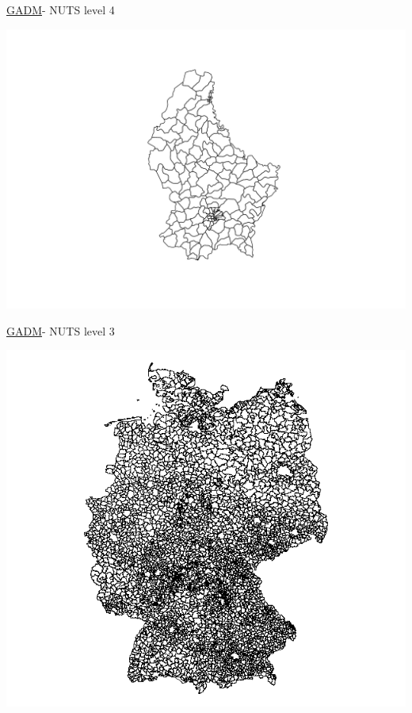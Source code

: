 \documentclass[ignorenonframetext,]{beamer}
\begin{document}
\begin{frame}{\href{http://www.gadm.org/}{GADM}- NUTS level 4}
\protect\hypertarget{gadm--nuts-level-4}{}

\includegraphics{Shapefiles_files/figure-beamer/LUX4-1.pdf}

\end{frame}

\begin{frame}{\href{http://www.gadm.org/}{GADM}- NUTS level 3}
\protect\hypertarget{gadm--nuts-level-3-1}{}

\includegraphics{figure/DEU3.png}

\end{frame}
\end{document}
